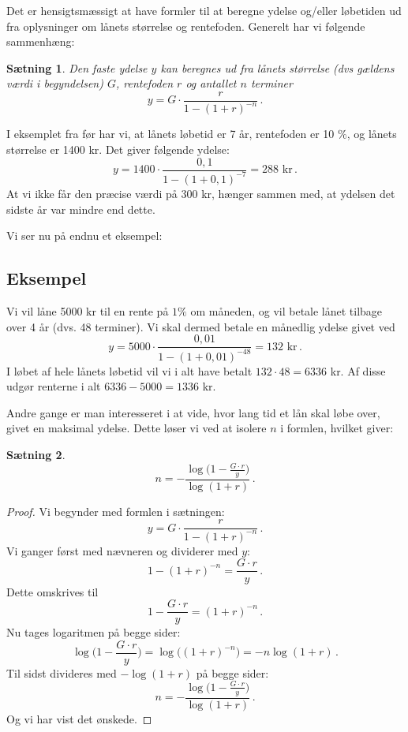 \documentclass[12pt,oneside,a4paper]{article}
\newtheorem{thm}{Sætning}[section]
\begin{document}
Det er hensigtsmæssigt at have formler til at beregne ydelse og/eller løbetiden
ud fra oplysninger om lånets størrelse og rentefoden.  Generelt har vi følgende
sammenhæng:
\begin{tcolorbox}
\begin{thm}
Den faste ydelse $y$ kan beregnes ud fra lånets størrelse (dvs gældens
værdi i begyndelsen) $G$, rentefoden $r$ og antallet $n$ terminer
\[
    y = G\cdot\frac{r}{1-(1+r)^{-n}}\,.
\]
\end{thm}
\end{tcolorbox}

I eksemplet fra før har vi, at lånets løbetid er 7 år, rentefoden er 10 $\%$, og
lånets størrelse er 1400 kr. Det giver følgende ydelse:
\[
y = 1400\cdot\frac{0,1}{1-(1+0,1)^{-7}} = 288 \,\,\mbox{kr}\,.
\]
At vi ikke får den præcise værdi på 300 kr, hænger sammen med, at ydelsen det
sidste år var mindre end dette.

Vi ser nu på endnu et eksempel:
\begin{tcolorbox}
\subsection*{Eksempel}
Vi vil låne 5000 kr til en rente på $1 \%$ om måneden, og vil betale lånet tilbage over 
4 år (dvs. 48 terminer).
Vi skal dermed betale en månedlig ydelse givet ved
\[
    y = 5000\cdot\frac{0,01}{1-(1+0,01)^{-48}} = 132 \,\,\mbox {kr} \,. 
\]
I løbet af hele lånets løbetid vil vi i alt have betalt $132\cdot 48 = 6336$ kr. Af
disse udgør renterne i alt $6336-5000 = 1336$ kr.
\end{tcolorbox}

Andre gange er man interesseret i at vide, hvor lang tid et lån skal løbe over, givet
en maksimal ydelse. Dette løser vi ved at isolere $n$ i formlen, hvilket giver:
\begin{tcolorbox}
\begin{thm}
\[
    n = -\frac{\log\big(1-\frac{G\cdot r}{y}\big)}{\log(1+r)} \,.
\]
\end{thm}
\begin{proof}
Vi begynder med formlen i sætningen:
\[
    y = G\cdot\frac{r}{1-(1+r)^{-n}}\,.
\]
Vi ganger først med nævneren og dividerer med $y$:
\[
1-(1+r)^{-n} = \frac{G\cdot r}{y}\,.
\]
Dette omskrives til
\[
1 - \frac{G\cdot r}{y} =(1+r)^{-n}\,.
\]
Nu tages logaritmen på begge sider:
\[
\log\big(1 - \frac{G\cdot r}{y}\big) =\log\big((1+r)^{-n}\big) = -n\log(1+r)\,.
\]
Til sidst divideres med $-\log(1+r)$ på begge sider:
\[
n = -\frac{\log\big(1-\frac{G\cdot r}{y}\big)}{\log(1+r)} \,.
\]
Og vi har vist det ønskede.
\end{proof}
\end{tcolorbox}
\end{document}
